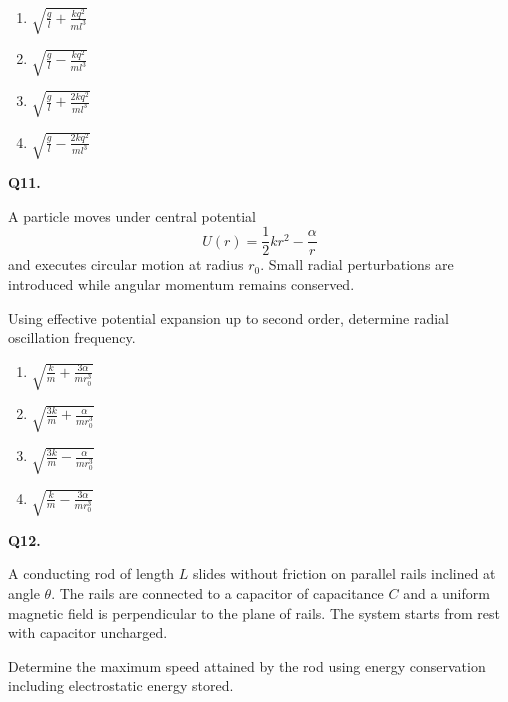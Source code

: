 \documentclass[12pt]{article}
\begin{document}
\begin{enumerate}
\item[(A)] $\sqrt{\frac{g}{l}+\frac{kq^2}{ml^3}}$
\item[(B)] $\sqrt{\frac{g}{l}-\frac{kq^2}{ml^3}}$
\item[(C)] $\sqrt{\frac{g}{l}+\frac{2kq^2}{ml^3}}$
\item[(D)] $\sqrt{\frac{g}{l}-\frac{2kq^2}{ml^3}}$
\end{enumerate}


\textbf{Q11.}

A particle moves under central potential  
\[
U(r)=\frac12 kr^2-\frac{\alpha}{r}
\]
and executes circular motion at radius $r_0$. Small radial perturbations are introduced while angular momentum remains conserved.

Using effective potential expansion up to second order, determine radial oscillation frequency.

\begin{enumerate}
\item[(A)] $\sqrt{\frac{k}{m}+\frac{3\alpha}{mr_0^3}}$
\item[(B)] $\sqrt{\frac{3k}{m}+\frac{\alpha}{mr_0^3}}$
\item[(C)] $\sqrt{\frac{3k}{m}-\frac{\alpha}{mr_0^3}}$
\item[(D)] $\sqrt{\frac{k}{m}-\frac{3\alpha}{mr_0^3}}$
\end{enumerate}


\textbf{Q12.}

A conducting rod of length $L$ slides without friction on parallel rails inclined at angle $\theta$. The rails are connected to a capacitor of capacitance $C$ and a uniform magnetic field is perpendicular to the plane of rails. The system starts from rest with capacitor uncharged.

Determine the maximum speed attained by the rod using energy conservation including electrostatic energy stored.

\begin{center}
\end{center}
\end{document}
